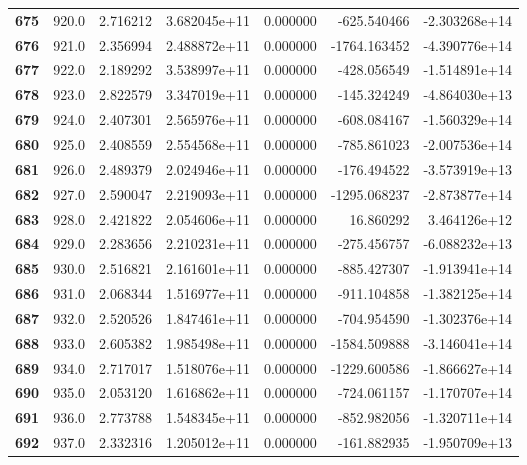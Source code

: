 \documentclass{report}[12pt]
\begin{document}
\begin{center}
\begin{tabular}{lrrrrrr}
\textbf{675 } &          920.0 &   2.716212 &  3.682045e+11 &    0.000000 &  -625.540466 & -2.303268e+14 \\
\textbf{676 } &          921.0 &   2.356994 &  2.488872e+11 &    0.000000 & -1764.163452 & -4.390776e+14 \\
\textbf{677 } &          922.0 &   2.189292 &  3.538997e+11 &    0.000000 &  -428.056549 & -1.514891e+14 \\
\textbf{678 } &          923.0 &   2.822579 &  3.347019e+11 &    0.000000 &  -145.324249 & -4.864030e+13 \\
\textbf{679 } &          924.0 &   2.407301 &  2.565976e+11 &    0.000000 &  -608.084167 & -1.560329e+14 \\
\textbf{680 } &          925.0 &   2.408559 &  2.554568e+11 &    0.000000 &  -785.861023 & -2.007536e+14 \\
\textbf{681 } &          926.0 &   2.489379 &  2.024946e+11 &    0.000000 &  -176.494522 & -3.573919e+13 \\
\textbf{682 } &          927.0 &   2.590047 &  2.219093e+11 &    0.000000 & -1295.068237 & -2.873877e+14 \\
\textbf{683 } &          928.0 &   2.421822 &  2.054606e+11 &    0.000000 &    16.860292 &  3.464126e+12 \\
\textbf{684 } &          929.0 &   2.283656 &  2.210231e+11 &    0.000000 &  -275.456757 & -6.088232e+13 \\
\textbf{685 } &          930.0 &   2.516821 &  2.161601e+11 &    0.000000 &  -885.427307 & -1.913941e+14 \\
\textbf{686 } &          931.0 &   2.068344 &  1.516977e+11 &    0.000000 &  -911.104858 & -1.382125e+14 \\
\textbf{687 } &          932.0 &   2.520526 &  1.847461e+11 &    0.000000 &  -704.954590 & -1.302376e+14 \\
\textbf{688 } &          933.0 &   2.605382 &  1.985498e+11 &    0.000000 & -1584.509888 & -3.146041e+14 \\
\textbf{689 } &          934.0 &   2.717017 &  1.518076e+11 &    0.000000 & -1229.600586 & -1.866627e+14 \\
\textbf{690 } &          935.0 &   2.053120 &  1.616862e+11 &    0.000000 &  -724.061157 & -1.170707e+14 \\
\textbf{691 } &          936.0 &   2.773788 &  1.548345e+11 &    0.000000 &  -852.982056 & -1.320711e+14 \\
\textbf{692 } &          937.0 &   2.332316 &  1.205012e+11 &    0.000000 &  -161.882935 & -1.950709e+13 \\

\end{tabular}
\end{center}
\end{document}
